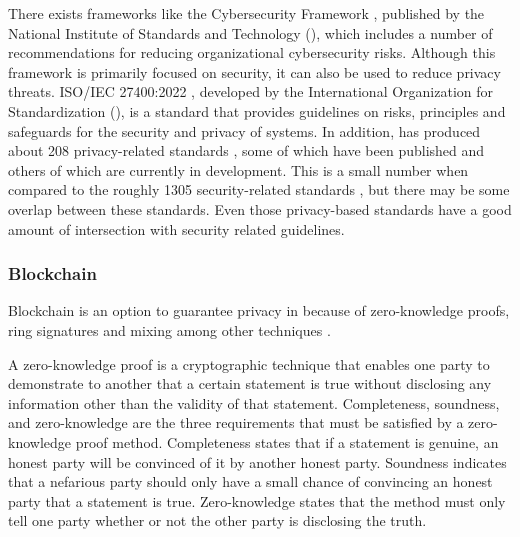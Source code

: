 There exists frameworks like the \hyperlink{\acronym}{\acronym} Cybersecurity Framework \cite{barrett2018framework},
published by the National Institute of Standards and Technology (\hyperlink{\acronym}{\acronym}),
which includes a number of recommendations for reducing organizational
cybersecurity risks. Although this framework is primarily focused on
security, it can also be used to reduce privacy threats.
ISO/IEC 27400:2022 \cite{iso2022cybersecurity}, developed by the International
Organization for Standardization (\hyperlink{\acronym}{\acronym}), is a standard that provides
guidelines on risks, principles and safeguards for the security and
privacy of \hyperlink{\acronym}{\acronym} systems. In addition, \hyperlink{\acronym}{\acronym} has produced about 208 privacy-related
standards \cite{iso2023privacysearch}, some of which have been published
and others of which are currently in development. This is a small number
when compared to the roughly 1305 security-related standards \cite{iso2023securitysearch},
but there may be some overlap between these standards. Even those \hyperlink{\acronym}{\acronym} privacy-based
standards have a good amount of intersection with security related
guidelines.

\subsubsection{Blockchain}

Blockchain is an option to guarantee privacy in \hyperlink{\acronym}{\acronym} because of zero-knowledge
proofs\cite{sun2021survey}, ring signatures \cite{mercer2016privacy} and mixing \cite{stone2021trustless}
among other techniques \cite{zhang2019security}.

A zero-knowledge proof is a cryptographic technique that enables one party
to demonstrate to another that a certain statement is true without disclosing
any information other than the validity of that statement. Completeness, soundness,
and zero-knowledge are the three requirements that must be satisfied by a
zero-knowledge proof method. Completeness states that if a
statement is genuine, an honest party will be convinced of it by another honest
party. Soundness indicates that a nefarious party should only have a small chance
of convincing an honest party that a statement is true. Zero-knowledge states
that the method must only tell one party whether or not the other party is
disclosing the truth.

